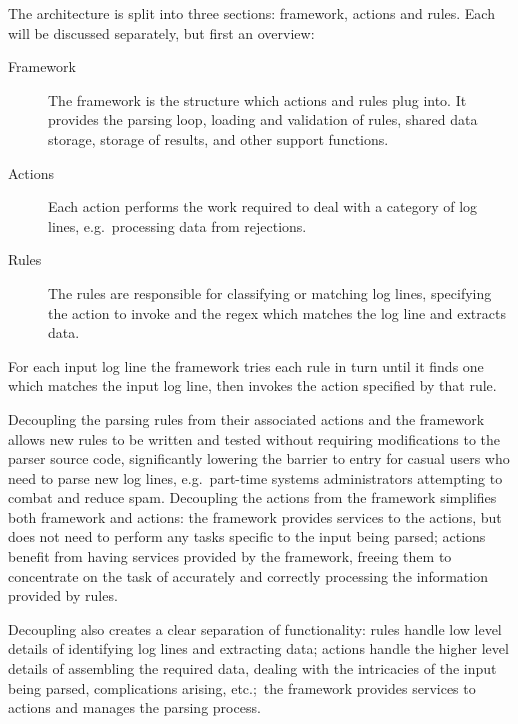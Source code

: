 \documentclass{svmult}
\begin{document}
\label{Architecture}

The architecture is split into three sections: framework, actions and
rules.  Each will be discussed separately, but first an overview:

\begin{description}

    \item [Framework]  The framework is the structure which actions and
        rules plug into.  It provides the parsing loop, loading and
        validation of rules, shared data storage, storage of results, and
        other support functions.

    \item [Actions]  Each action performs the work required to deal with a
        category of log lines, e.g.\ processing data from rejections.

    \item [Rules]  The rules are responsible for classifying or matching
        log lines, specifying the action to invoke and the regex which
        matches the log line and extracts data.

\end{description}

For each input log line the framework tries each rule in turn until it
finds one which matches the input log line, then invokes the action
specified by that rule.

Decoupling the parsing rules from their associated actions and the
framework allows new rules to be written and tested without requiring
modifications to the parser source code, significantly lowering the barrier
to entry for casual users who need to parse new log lines, e.g.\ part-time
systems administrators attempting to combat and reduce spam.  Decoupling
the actions from the framework simplifies both framework and actions: the
framework provides services to the actions, but does not need to perform
any tasks specific to the input being parsed; actions benefit from having
services provided by the framework, freeing them to concentrate on the task
of accurately and correctly processing the information provided by rules.

Decoupling also creates a clear separation of functionality: rules handle
low level details of identifying log lines and extracting data; actions
handle the higher level details of assembling the required data, dealing
with the intricacies of the input being parsed, complications arising,
etc.;\ the framework provides services to actions and manages the parsing
process.
\end{document}
